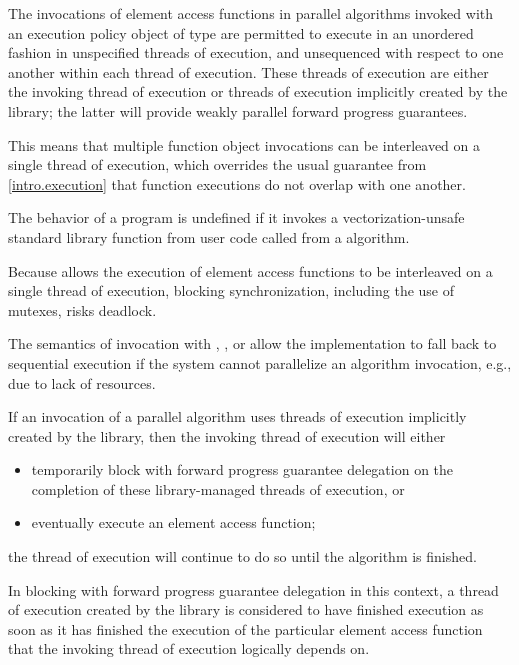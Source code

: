 \pnum
The invocations of element access functions in parallel algorithms invoked with
an execution policy object of type  are
permitted to execute
in an unordered fashion in unspecified threads of execution, and
unsequenced with respect to one another within each thread of execution.
These threads of execution are
either the invoking thread of execution
or threads of execution implicitly created by the library;
the latter will provide weakly parallel forward progress guarantees.
\begin{note}
This means that multiple function object invocations can be interleaved
on a single thread of execution,
which overrides the usual guarantee from \ref{intro.execution}
that function executions do not overlap with one another.
\end{note}
The behavior of a program is undefined if
it invokes a vectorization-unsafe standard library function
from user code
called from a  algorithm.
\begin{note}
Because  allows
the execution of element access functions
to be interleaved on a single thread of execution,
blocking synchronization, including the use of mutexes, risks deadlock.
\end{note}

\pnum
\begin{note}
The semantics of invocation with
,
, or
allow the implementation to fall back to sequential execution
if the system cannot parallelize an algorithm invocation,
e.g., due to lack of resources.
\end{note}

\pnum
If an invocation of a parallel algorithm uses threads of execution
implicitly created by the library,
then the invoking thread of execution will either
\begin{itemize}
\item
  temporarily block
  with forward progress guarantee delegation
  on the completion of these library-managed threads of execution, or
\item
  eventually execute an element access function;
\end{itemize}
the thread of execution will continue to do so until the algorithm is finished.
\begin{note}
In blocking with forward progress guarantee delegation in this context,
a thread of execution created by the library
is considered to have finished execution
as soon as it has finished the execution
of the particular element access function
that the invoking thread of execution logically depends on.
\end{note}

